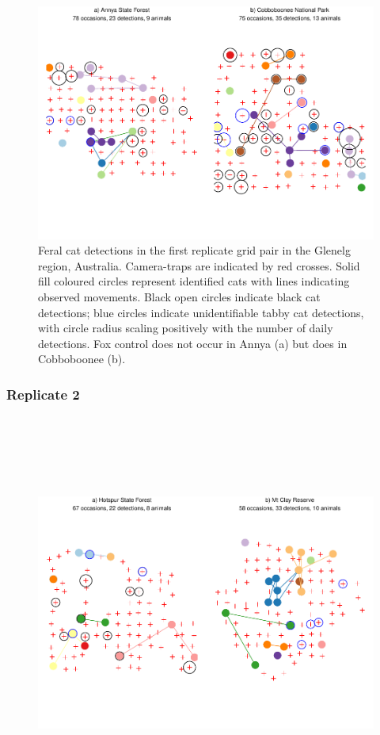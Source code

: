 \documentclass[11pt,a4paper,titlepage,twoside,openright]{style/unimelbthesis}
\begin{document}
\begin{mainmatter}
\begin{figure}
{\centering \includegraphics[width=1\linewidth]{figure/density-plot-ch-1-1} 

}

\caption{Feral cat detections in the first replicate grid pair in the Glenelg region, Australia. Camera-traps are indicated by red crosses. Solid fill coloured circles represent identified cats with lines indicating observed movements. Black open circles indicate black cat detections; blue circles indicate unidentifiable tabby cat detections, with circle radius scaling positively with the number of daily detections. Fox control does not occur in Annya (a) but does in Cobboboonee (b).}\label{fig:density-plot-ch-1}
\end{figure}
\newpage

\hypertarget{replicate-2}{%
\subsubsection{Replicate 2}\label{replicate-2}}

\(~\)

\(~\)

\(~\)
\begin{figure}

{\centering \includegraphics[width=1\linewidth]{figure/density-plot-ch-2-1} 

}
\end{figure}
\end{mainmatter}
\end{document}
